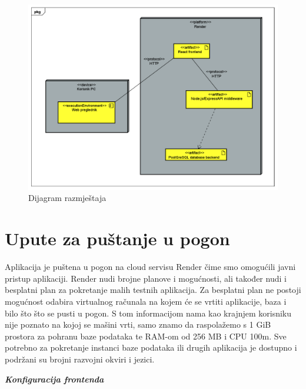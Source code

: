 			\begin{figure}[H]
				\centering
				\includegraphics[width=\textwidth]{slike/UML_Deployment.png} %
				\caption{Dijagram razmještaja}
				\label{fig:dijagram razmještaja}
			\end{figure}
			
			\eject 
		
		\section{Upute za puštanje u pogon}
		
			Aplikacija je puštena u pogon na cloud servisu Render čime smo omogućili javni pristup aplikaciji. Render nudi brojne planove i mogućnosti, ali također nudi i besplatni plan za pokretanje malih testnih aplikacija. Za besplatni plan ne postoji mogućnost odabira virtualnog računala na kojem će se vrtiti aplikacije, baza i bilo što što se pusti u pogon. S tom informacijom nama kao krajnjem korisniku nije poznato na kojoj se mašini vrti, samo znamo da raspolažemo s 1 GiB prostora za pohranu baze podataka te RAM-om od 256 MB i CPU 100m. Sve potrebno za pokretanje instanci baze podataka ili drugih aplikacija je dostupno i podržani su brojni razvojni okviri i jezici.
			
			\break
			
			\textbf{\textit{Konfiguracija frontenda}}
			
